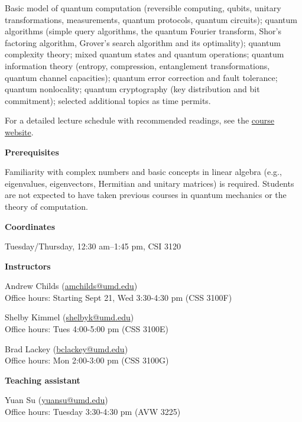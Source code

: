 \documentclass[11pt]{article}
\begin{document}
Basic model of quantum computation (reversible computing, qubits, unitary transformations, measurements, quantum protocols, quantum circuits); quantum algorithms (simple query algorithms, the quantum Fourier transform, Shor's factoring algorithm, Grover's search algorithm and its optimality); quantum complexity theory; mixed quantum states and quantum operations; quantum information theory (entropy, compression, entanglement transformations, quantum channel capacities); quantum error correction and fault tolerance; quantum nonlocality; quantum cryptography (key distribution and bit commitment); selected additional topics as time permits.

For a detailed lecture schedule with recommended readings, see the \href{http://terp.ps/introqip}{course website}.

\medskip

{\bf Prerequisites}

Familiarity with complex numbers and basic concepts in linear algebra (e.g., eigenvalues, eigenvectors, Hermitian and unitary matrices) is required.  Students are not expected to have taken previous courses in quantum mechanics or the theory of computation.

\medskip

{\bf Coordinates}

Tuesday/Thursday, 12:30 am--1:45 pm, CSI 3120

\medskip

{\bf Instructors}

Andrew Childs (\href{mailto:amchilds@umd.edu}{amchilds@umd.edu}) \\
Office hours: Starting Sept 21, Wed 3:30-4:30 pm (CSS 3100F)

\smallskip

Shelby Kimmel (\href{mailto:shelbyk@umd.edu}{shelbyk@umd.edu}) \\
Office hours: Tues 4:00-5:00 pm (CSS 3100E)

\smallskip

Brad Lackey (\href{mailto:bclackey@umd.edu}{bclackey@umd.edu}) \\
Office hours: Mon 2:00-3:00 pm (CSS 3100G) 


\medskip

{\bf Teaching assistant}

Yuan Su (\href{mailto:yuansu@umd.edu}{yuansu@umd.edu}) \\
Office hours: Tuesday 3:30-4:30 pm (AVW 3225)
\end{document}
